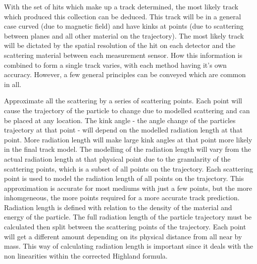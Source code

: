 With the set of hits which make up a track determined, the most likely track which produced this collection can be deduced. This track will be in a general case curved (due to magnetic field) and have kinks at points (due to scattering between planes and all other material on the trajectory). The most likely track will be dictated by the spatial resolution of the hit on each detector and the scattering material between each measurement sensor. How this information is combined to form a single track varies, with each method having it's own accuracy. However, a few general principles can be conveyed which are common in all. 
\begin{changemargin}{1em}{2em}
Approximate all the scattering by a series of scattering points. Each point will cause the trajectory of the particle to change due to modelled scattering and can be placed at any location. The kink angle - the angle change of the particles trajectory at that point - will depend on the modelled radiation length at that point. More radiation length will make large kink angles at that point more likely in the final track model. The modelling of the radiation length will vary from the actual radiation length at that physical point due to the granularity of the scattering points, which is a subset of all points on the trajectory. Each scattering point is used to model the radiation length of all points on the trajectory. This approximation is accurate for most mediums with just a few points, but the more inhomgeneous, the more points required for a more accurate track prediction. Radiation length is defined with relation to the density of the material and energy of the particle. The full radiation length of the particle trajectory must be calculated then split between the scattering points of the trajectory. Each point will get a different amount depending on its physical distance from all near by mass. This way of calculating radiation length is important since it deals with the non linearities within the corrected Highland formula.      


\end{changemargin}
